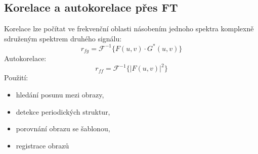 \subsection*{Korelace a autokorelace přes FT}
Korelace lze počítat ve frekvenční oblasti násobením jednoho spektra komplexně sdruženým spektrem druhého signálu:
\begin{equation}
    r_{fg}=\mathcal{F}^{-1}\{F(u,v)\cdot G^*(u,v)\}
\end{equation}
Autokorelace:
\begin{equation}
    r_{ff}=\mathcal{F}^{-1}\{|F(u,v)|^2\}
\end{equation}
Použití:
\begin{itemize}
    \item hledání posunu mezi obrazy,
    \item detekce periodických struktur,
    \item porovnání obrazu se šablonou,
    \item registrace obrazů
\end{itemize}
